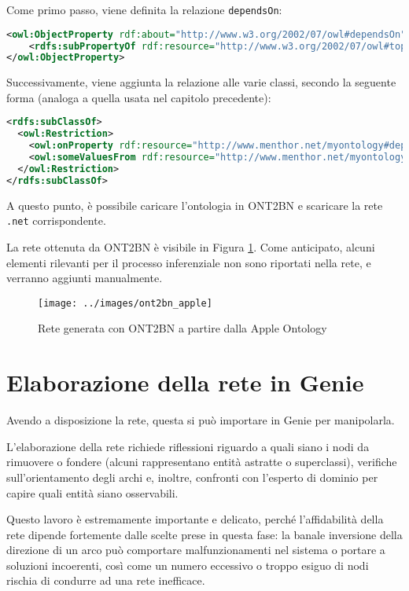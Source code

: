 Come primo passo, viene definita la relazione \texttt{dependsOn}:
\begin{lstlisting}[language=xml]
<owl:ObjectProperty rdf:about="http://www.w3.org/2002/07/owl#dependsOn">
	<rdfs:subPropertyOf rdf:resource="http://www.w3.org/2002/07/owl#topObjectProperty"/>
</owl:ObjectProperty>
\end{lstlisting}

Successivamente, viene aggiunta la relazione alle varie classi, secondo la seguente forma (analoga a quella usata nel capitolo precedente):
\begin{lstlisting}[language=xml]
<rdfs:subClassOf>
  <owl:Restriction>
    <owl:onProperty rdf:resource="http://www.menthor.net/myontology#dependsOn"/>
    <owl:someValuesFrom rdf:resource="http://www.menthor.net/myontology#Apple_Pathology_Dispositional_Factor"/>
  </owl:Restriction>
</rdfs:subClassOf>
\end{lstlisting}

A questo punto, è possibile caricare l'ontologia in ONT2BN e scaricare la rete \texttt{.net} corrispondente.

La rete ottenuta da ONT2BN è visibile in Figura \ref{fig:ont2bnappleontology}.
Come anticipato, alcuni elementi rilevanti per il processo inferenziale non sono riportati nella rete, e verranno aggiunti manualmente.

\newpage
\begin{figure}[H]
	\centering	
	\texttt{[image: ../images/ont2bn\_apple]}
	\caption{Rete generata con ONT2BN a partire dalla Apple Ontology}
	\label{fig:ont2bnappleontology}
\end{figure}


\section{Elaborazione della rete in Genie}
Avendo a disposizione la rete, questa si può importare in Genie per manipolarla.

L'elaborazione della rete richiede riflessioni riguardo a quali siano i nodi da rimuovere o fondere (alcuni rappresentano entità astratte o superclassi), verifiche sull'orientamento degli archi e, inoltre, confronti con l'esperto di dominio per capire quali entità siano osservabili.

Questo lavoro è estremamente importante e delicato, perché l'affidabilità della rete dipende fortemente dalle scelte prese in questa fase: la banale inversione della direzione di un arco può comportare malfunzionamenti nel sistema o portare a soluzioni incoerenti, così come un numero eccessivo o troppo esiguo di nodi rischia di condurre ad una rete inefficace.

